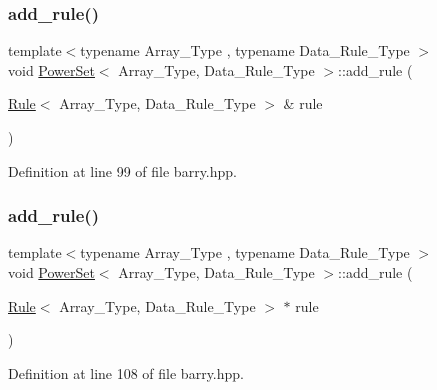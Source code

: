 \subsubsection{\texorpdfstring{add\+\_\+rule()}{add\_rule()}\hspace{0.1cm}{\footnotesize\ttfamily [1/3]}}
{\footnotesize\ttfamily template$<$typename Array\+\_\+\+Type , typename Data\+\_\+\+Rule\+\_\+\+Type $>$ \\
void \hyperlink{classbarry_1_1_power_set}{Power\+Set}$<$ Array\+\_\+\+Type, Data\+\_\+\+Rule\+\_\+\+Type $>$\+::add\+\_\+rule (\begin{DoxyParamCaption}\item[{\hyperlink{classbarry_1_1_rule}{Rule}$<$ Array\+\_\+\+Type, Data\+\_\+\+Rule\+\_\+\+Type $>$ \&}]{rule }\end{DoxyParamCaption})\hspace{0.3cm}{\ttfamily [inline]}}



Definition at line 99 of file barry.\+hpp.

\mbox{\label{classbarry_1_1_power_set_a6cb8fb8f09b4c190e2ac6c07daa1241e}} 
\subsubsection{\texorpdfstring{add\+\_\+rule()}{add\_rule()}\hspace{0.1cm}{\footnotesize\ttfamily [2/3]}}
{\footnotesize\ttfamily template$<$typename Array\+\_\+\+Type , typename Data\+\_\+\+Rule\+\_\+\+Type $>$ \\
void \hyperlink{classbarry_1_1_power_set}{Power\+Set}$<$ Array\+\_\+\+Type, Data\+\_\+\+Rule\+\_\+\+Type $>$\+::add\+\_\+rule (\begin{DoxyParamCaption}\item[{\hyperlink{classbarry_1_1_rule}{Rule}$<$ Array\+\_\+\+Type, Data\+\_\+\+Rule\+\_\+\+Type $>$ $\ast$}]{rule }\end{DoxyParamCaption})\hspace{0.3cm}{\ttfamily [inline]}}



Definition at line 108 of file barry.\+hpp.

\mbox{\label{classbarry_1_1_power_set_aae5eae12186fff037efa3884ac2b3dcc}} 
